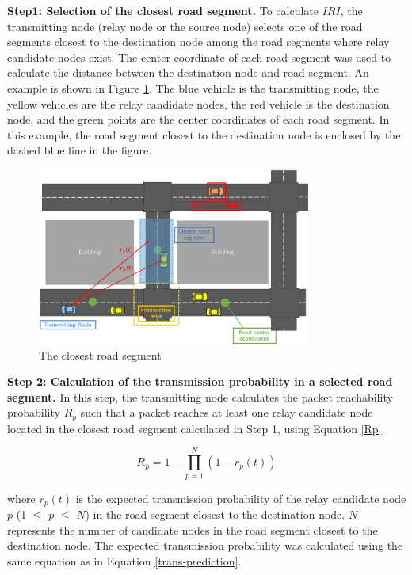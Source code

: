 \documentclass[conference]{IEEEtran}
\begin{document}
\textbf{Step1: Selection of the closest road segment.}
To calculate $IRI$, the transmitting node (relay node or the source node) selects one of the road segments closest to the destination node among the road segments where relay candidate nodes exist.
The center coordinate of each road segment was used to calculate the distance between the destination node and road segment. An example is shown in Figure \ref{fig:closest_road}.
The blue vehicle is the transmitting node, the yellow vehicles are the relay candidate nodes, the red vehicle is the destination node, and the green points are the center coordinates of each road segment. In this example, the road segment closest to the destination node is  enclosed by the dashed blue line in the figure.

\begin{figure}[!ht]
\centering
\includegraphics[width=90mm]{figures/closest_road.eps}
\caption{The closest road segment}
\label{fig:closest_road}
\end{figure}


\textbf{Step 2: Calculation of the transmission probability in a selected road segment.}
In this step, the transmitting node calculates the packet reachability probability $R_p$ such that a packet reaches at least one relay candidate node located in the closest road segment calculated in Step 1, using Equation \ref{Rp}.

\begin{equation}
\label{Rp}
R_p = 1 - \prod_{p=1}^N (1 - r_{p}(t))
\end{equation}

where $r_p(t)$ is the expected transmission probability of the relay candidate node $p$ (1 $\leq$  $p$ $\leq$ $N$) in the road segment closest to the destination node. 
$N$ represents the number of candidate nodes in the road segment closest to the destination node. 
The expected transmission probability was calculated using the same equation as in Equation \ref{trans-prediction}.
\end{document}
